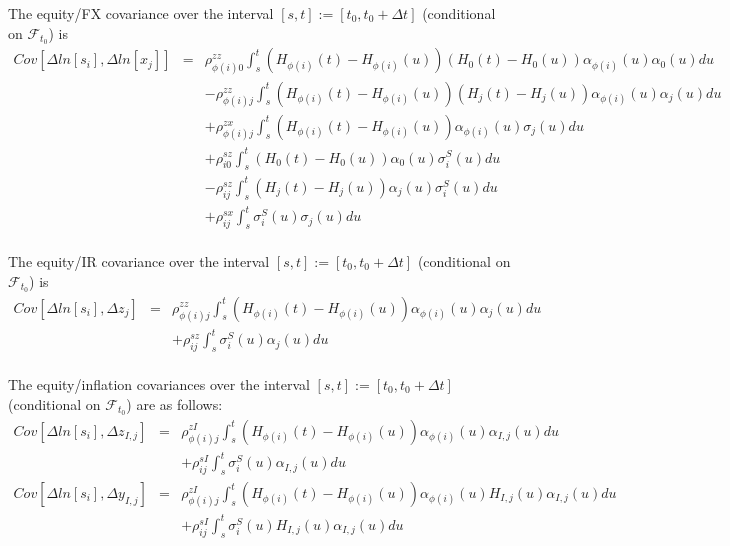 The equity/FX covariance over the interval $[s,t] := [t_0, t_0+\Delta t]$ (conditional on $\mathcal{F}_{t_0}$) is
\begin{eqnarray*}
	Cov \left[\Delta ln[s_i], \Delta ln[x_j] \right] &=&
	\rho_{\phi(i)0}^{zz} \int_s^t (H_{\phi(i)} (t) - H_{\phi(i)} (u)) (H_0 (t) - H_0 (u)) \alpha_{\phi(i)}(u) 
	\alpha_0(u) 
	du\\
	&& - \rho_{\phi(i)j}^{zz} \int_s^t (H_{\phi(i)} (t) - H_{\phi(i)} (u)) (H_j (t) - H_j (u)) \alpha_{\phi(i)} 
	(u)\alpha_j(u) du\\
	&& + \rho_{\phi(i)j}^{zx} \int_s^t (H_{\phi(i)} (t) - H_{\phi(i)} (u)) \alpha_{\phi(i)} (u) \sigma_j(u) du\\
	&&+ \rho_{i0}^{sz} \int_s^t (H_0 (t) - H_0 (u)) \alpha_0 (u) \sigma_i^S(u) du\\
	&&- \rho_{ij}^{sz} \int_s^t (H_j (t) - H_j (u)) \alpha_j (u) \sigma_i^S(u) du\\
	&&+ \rho_{ij}^{sx} \int_s^t \sigma_i^S(u) \sigma_j(u) du\\
\end{eqnarray*}

The equity/IR covariance over the interval $[s,t] := [t_0, t_0+\Delta t]$ (conditional on $\mathcal{F}_{t_0}$) is
\begin{eqnarray*}
	Cov \left[\Delta ln[s_i], \Delta z_j \right] &=&
	\rho_{\phi(i)j}^{zz} \int_s^t (H_{\phi(i)} (t) - H_{\phi(i)} (u)) \alpha_{\phi(i)} (u) \alpha_j (u) du\\
	&&+ \rho_{ij}^{sz} \int_s^t \sigma_i^S (u) \alpha_j (u) du\\
\end{eqnarray*}

The equity/inflation covariances over the interval $[s,t] := [t_0, t_0+\Delta t]$ (conditional on $\mathcal{F}_{t_0}$) are as follows:
\begin{eqnarray*}
	Cov \left[\Delta ln[s_i], \Delta z_{I,j} \right] &=&
	\rho_{\phi(i)j}^{zI} \int_s^t (H_{\phi(i)} (t) - H_{\phi(i)} (u)) \alpha_{\phi(i)} (u) \alpha_{I,j} (u) du\\
	&&+ \rho_{ij}^{sI} \int_s^t \sigma_i^S (u) \alpha_{I,j} (u) du\\	
	Cov \left[\Delta ln[s_i], \Delta y_{I,j} \right] &=&
	\rho_{\phi(i)j}^{zI} \int_s^t (H_{\phi(i)} (t) - H_{\phi(i)} (u)) \alpha_{\phi(i)} (u) H_{I,j} (u) \alpha_{I,j} (u) du\\
	&&+ \rho_{ij}^{sI} \int_s^t \sigma_i^S (u) H_{I,j} (u) \alpha_{I,j} (u) du\\
\end{eqnarray*}


